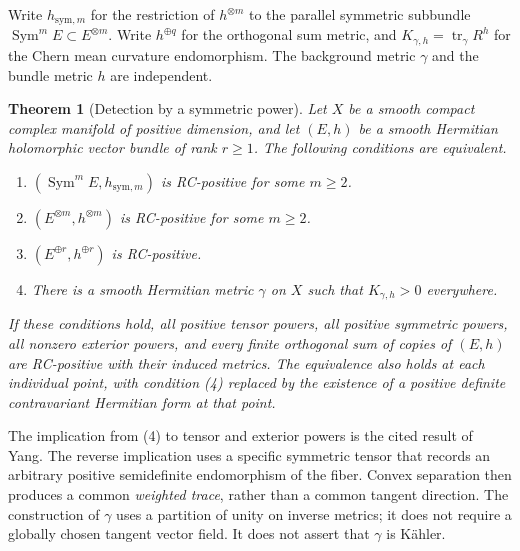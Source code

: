 \documentclass[12pt]{amsart}
\newtheorem{thm}{Theorem}[section]
\theoremstyle{definition}
\theoremstyle{remark}
\numberwithin{equation}{section}
\DeclareMathOperator{\tr}{tr}
\DeclareMathOperator{\Sym}{Sym}
\theoremstyle{definition}
\begin{document}
Write $h_{\mathrm{sym},m}$ for the restriction of $h^{\otimes m}$ to the
parallel symmetric subbundle $\Sym^m E\subset E^{\otimes m}$. Write
$h^{\oplus q}$ for the orthogonal sum metric, and
$K_{\gamma,h}=\tr_\gamma R^h$ for the Chern mean curvature endomorphism.
The background metric $\gamma$ and the bundle metric $h$ are independent.

\begin{thm}[Detection by a symmetric power]\label{en:main}
Let $X$ be a smooth compact complex manifold of positive dimension, and
let $(E,h)$ be a smooth Hermitian holomorphic vector bundle of rank $r\geq1$.
The following conditions are equivalent.
\begin{enumerate}
\item $(\Sym^m E,h_{\mathrm{sym},m})$ is RC-positive for some $m\geq2$.
\item $(E^{\otimes m},h^{\otimes m})$ is RC-positive for some $m\geq2$.
\item $(E^{\oplus r},h^{\oplus r})$ is RC-positive.
\item There is a smooth Hermitian metric $\gamma$ on $X$ such that
$K_{\gamma,h}>0$ everywhere.
\end{enumerate}
If these conditions hold, all positive tensor powers, all positive
symmetric powers, all nonzero exterior powers, and every finite orthogonal
sum of copies of $(E,h)$ are RC-positive with their induced metrics.
The equivalence also holds at each individual point, with condition (4)
replaced by the existence of a positive definite contravariant Hermitian
form at that point.
\end{thm}

The implication from (4) to tensor and exterior powers is the cited
result of Yang. The reverse implication uses a specific symmetric tensor
that records an arbitrary positive semidefinite endomorphism of the fiber.
Convex separation then produces a common \emph{weighted trace}, rather
than a common tangent direction. The construction of $\gamma$ uses a
partition of unity on inverse metrics; it does not require a globally
chosen tangent vector field. It does not assert that $\gamma$ is K\"ahler.
\end{document}
